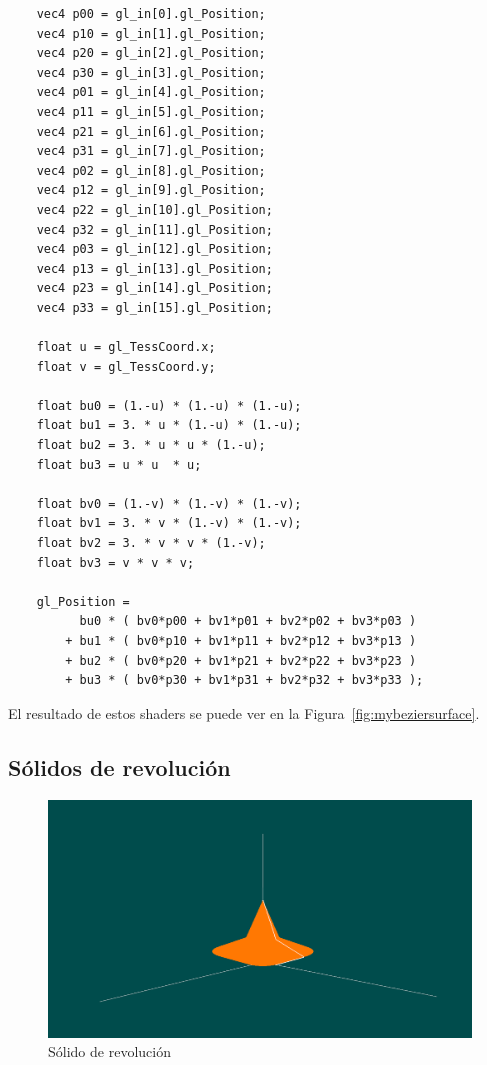 \begin{verbatim}
    vec4 p00 = gl_in[0].gl_Position;
    vec4 p10 = gl_in[1].gl_Position;
    vec4 p20 = gl_in[2].gl_Position;
    vec4 p30 = gl_in[3].gl_Position;
    vec4 p01 = gl_in[4].gl_Position;
    vec4 p11 = gl_in[5].gl_Position;
    vec4 p21 = gl_in[6].gl_Position;
    vec4 p31 = gl_in[7].gl_Position;
    vec4 p02 = gl_in[8].gl_Position;
    vec4 p12 = gl_in[9].gl_Position;
    vec4 p22 = gl_in[10].gl_Position;
    vec4 p32 = gl_in[11].gl_Position;
    vec4 p03 = gl_in[12].gl_Position;
    vec4 p13 = gl_in[13].gl_Position;
    vec4 p23 = gl_in[14].gl_Position;
    vec4 p33 = gl_in[15].gl_Position;
    
    float u = gl_TessCoord.x;
    float v = gl_TessCoord.y;
    
    float bu0 = (1.-u) * (1.-u) * (1.-u);
    float bu1 = 3. * u * (1.-u) * (1.-u);
    float bu2 = 3. * u * u * (1.-u);
    float bu3 = u * u  * u;
    
    float bv0 = (1.-v) * (1.-v) * (1.-v);
    float bv1 = 3. * v * (1.-v) * (1.-v);
    float bv2 = 3. * v * v * (1.-v);
    float bv3 = v * v * v;
    
    gl_Position = 
          bu0 * ( bv0*p00 + bv1*p01 + bv2*p02 + bv3*p03 )
        + bu1 * ( bv0*p10 + bv1*p11 + bv2*p12 + bv3*p13 )
        + bu2 * ( bv0*p20 + bv1*p21 + bv2*p22 + bv3*p23 )
        + bu3 * ( bv0*p30 + bv1*p31 + bv2*p32 + bv3*p33 );

\end{verbatim}

El resultado de estos shaders se puede ver en la
Figura~\ref{fig:mybeziersurface}.

\subsection{Sólidos de revolución}
\label{makereference5.5.4}

\begin{figure}
	\centering		
	\includegraphics[width=\textwidth]{figures/myrevolution.png}
	\caption{Sólido de revolución}
	\label{fig:myrevolution}
\end{figure}


